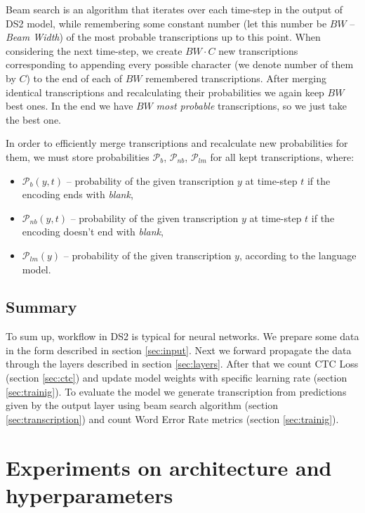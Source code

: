 \documentclass[licencjacka,en]{pracamgr}
\begin{document}
	Beam search is an algorithm that iterates over each time-step in the output of DS2 model, while remembering some constant number (let this number be $BW$ -- \textit{Beam Width}) of the most probable transcriptions up to this point. When considering the next time-step, we create $BW \cdot C$ new transcriptions corresponding to appending every possible character (we denote number of them by $C$) to the end of each of $BW$ remembered transcriptions. After merging identical transcriptions and recalculating their probabilities we again keep $BW$ best ones. In the end we have $BW$ \textit{most probable} transcriptions, so we just take the best one.
	
	In order to efficiently merge transcriptions and recalculate new probabilities for them, we must store probabilities $\mathcal{P}_{b}$, $\mathcal{P}_{nb}$, $\mathcal{P}_{lm}$ for all kept transcriptions, where:
	\begin{itemize}
		\item $\mathcal{P}_{b}(y, t)$ -- probability of the given transcription $y$ at time-step $t$ if the encoding ends with \textit{blank},
		\item $\mathcal{P}_{nb}(y, t)$ -- probability of the given transcription $y$ at time-step $t$ if the encoding doesn't end with \textit{blank},
		\item $\mathcal{P}_{lm}(y)$ -- probability of the given transcription $y$, according to the language model.\\
	\end{itemize}
	
	\section{Summary}
	To sum up, workflow in DS2 is typical for neural networks. We prepare some data in the form described in section \ref{sec:input}. Next we forward propagate the data through the layers described in section \ref{sec:layers}. After that we count CTC Loss (section \ref{sec:ctc}) and update model weights with specific learning rate (section \ref{sec:trainig}). To evaluate the model we generate transcription from predictions given by the output layer using beam search algorithm (section \ref{sec:transcription}) and count Word Error Rate metrics (section \ref{sec:trainig}).
	
	
	\chapter{Experiments on architecture and hyperparameters}\label{r:experiments}
\end{document}
